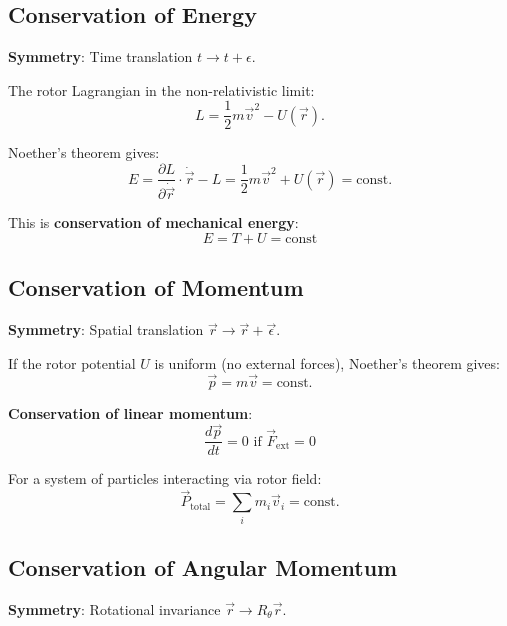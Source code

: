 \documentclass[12pt,a4paper]{article}
\theoremstyle{definition}
\theoremstyle{remark}
\begin{document}
\subsection{Conservation of Energy}

\textbf{Symmetry}: Time translation $t \to t + \epsilon$.

The rotor Lagrangian in the non-relativistic limit:
\begin{equation}
L = \frac{1}{2}m\vec{v}^2 - U(\vec{r}).
\end{equation}

Noether's theorem gives:
\begin{equation}
E = \frac{\partial L}{\partial \dot{\vec{r}}} \cdot \dot{\vec{r}} - L = \frac{1}{2}m\vec{v}^2 + U(\vec{r}) = \text{const}.
\end{equation}

This is \textbf{conservation of mechanical energy}:
\begin{equation}
\boxed{E = T + U = \text{const}}
\end{equation}

\subsection{Conservation of Momentum}

\textbf{Symmetry}: Spatial translation $\vec{r} \to \vec{r} + \vec{\epsilon}$.

If the rotor potential $U$ is uniform (no external forces), Noether's theorem gives:
\begin{equation}
\vec{p} = m\vec{v} = \text{const}.
\end{equation}

\textbf{Conservation of linear momentum}:
\begin{equation}
\boxed{\frac{d\vec{p}}{dt} = 0 \text{ if } \vec{F}_{\text{ext}} = 0}
\end{equation}

For a system of particles interacting via rotor field:
\begin{equation}
\vec{P}_{\text{total}} = \sum_i m_i \vec{v}_i = \text{const}.
\end{equation}

\subsection{Conservation of Angular Momentum}

\textbf{Symmetry}: Rotational invariance $\vec{r} \to R_\theta \vec{r}$.
\end{document}

